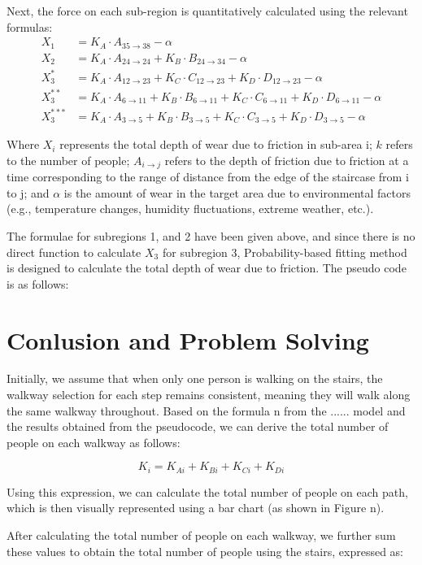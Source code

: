 \documentclass{mcmthesis}
\begin{document}
 Next, the force on each sub-region is quantitatively calculated using the relevant formulas:
 \begin{align}
  X_1 &= K_A \cdot A_{35 \to 38} - \alpha \\
  X_2 &= K_A \cdot A_{24 \to 24} + K_B \cdot B_{24 \to 34} - \alpha \\
  X_3^* &= K_A \cdot A_{12 \to 23} + K_C \cdot C_{12 \to 23} + K_D \cdot D_{12 \to 23} - \alpha \\
  X_3^{**} &= K_A \cdot A_{6 \to 11} + K_B \cdot B_{6 \to 11} + K_C \cdot C_{6 \to 11} + K_D \cdot D_{6 \to 11} - \alpha \\
  X_3^{***} &= K_A \cdot A_{3 \to 5} + K_B \cdot B_{3 \to 5} + K_C \cdot C_{3 \to 5} + K_D \cdot D_{3 \to 5} - \alpha
  \end{align}
  

Where $X_i$ represents the total depth of wear due to friction in sub-area i; $k$ refers to the number of people; $A_{i \to j}$ refers to the depth of friction due to friction at a time corresponding to the range of distance from the edge of the staircase from i to j; and $\alpha$ is the amount of wear in the target area due to environmental factors (e.g., temperature changes, humidity fluctuations, extreme weather, etc.).

The formulae for subregions 1, and 2 have been given above, and since there is no direct function to calculate $X_3$ for subregion 3, Probability-based fitting method is designed to calculate the total depth of wear due to friction. The pseudo code is as follows:

\section{Conlusion and Problem Solving}



Initially, we assume that when only one person is walking on the stairs, the walkway selection for each step remains consistent, meaning they will walk along the same walkway throughout. Based on the formula n from the ...... model and the results obtained from the pseudocode, we can derive the total number of people on each walkway as follows:

\[ K_i = K_{Ai} + K_{Bi} + K_{Ci} + K_{Di} \]

Using this expression, we can calculate the total number of people on each path, which is then visually represented using a bar chart (as shown in Figure n).

After calculating the total number of people on each walkway, we further sum these values to obtain the total number of people using the stairs, expressed as:
\end{document}

